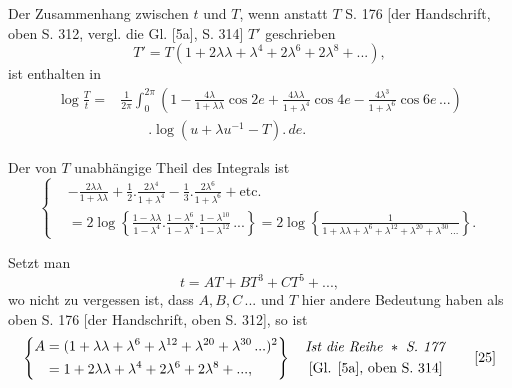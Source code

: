 \begingroup
\makeatletter\tagsleft@true\let\veqno\@@leqno\makeatother
\clearpage{}
\par\indent Der Zusammenhang zwischen $t$ und $T$, wenn anstatt $T$ S. 176 [der Handschrift, oben S. 312, vergl. die Gl. [5a], S. 314] $T'$ geschrieben
\begin{equation}
T'=T(1+2\lambda\lambda+\lambda^4+2\lambda^6+2\lambda^8+{.}{.}{.}),\tag*{[21]}
\end{equation}
\noindent ist enthalten in
\begin{equation}
\begin{aligned}
\log\frac Tt={}&\frac1{2\pi}\int_0^{2\pi}\left(1-\frac{4\lambda}{1+\lambda\lambda}\cos2e+\frac{4\lambda\lambda}{1+\lambda^4}\cos4e-\frac{4\lambda^3}{1+\lambda^6}\cos6e\,{.}{.}{.}\right)\\
&\qquad.\log(u+\lambda u^{-1}-T).\,de.
\end{aligned}\tag*{[22]}
\end{equation}
\par\indent Der von $T$ unabhängige Theil des Integrals ist
{\small\begin{equation}
\left\{\begin{aligned}
&-\frac{2\lambda\lambda}{1+\lambda\lambda}+\frac12.\frac{2\lambda^4}{1+\lambda^4}-\frac13.\frac{2\lambda^6}{1+\lambda^6}+\text{etc.}\\
&=2\log\left\{\frac{1-\lambda\lambda}{1-\lambda^4}.\frac{1-\lambda^6}{1-\lambda^8}.\frac{1-\lambda^{10}}{1-\lambda^{12}}\,{.}{.}{.}\right\}=2\log\left\{\frac1{1+\lambda\lambda+\lambda^6+\lambda^{12}+\lambda^{20}+\lambda^{30}\,{.}{.}{.}}\right\}.
\end{aligned}\right.\tag*{[23]}
\end{equation}}
\noindent {\small[S. 225]}
\par\indent Setzt man
\begin{equation}
t=AT+BT^3+CT^5+{.}{.}{.},\tag*{[24]}
\end{equation}
\noindent wo nicht zu vergessen ist, dass $A,B,C\,{.}{.}{.}$ und $T$ hier andere Bedeutung haben als oben S. 176 [der Handschrift, oben S. 312], so ist
{\small\begin{equation}
\left\{\begin{aligned}
A&=(1+\lambda\lambda+\lambda^6+\lambda^{12}+\lambda^{20}+\lambda^{30}\,{.}{.}{.})^2\\
&=1+2\lambda\lambda+\lambda^4+2\lambda^6+2\lambda^8+{.}{.}{.},
\end{aligned}\right\}\quad
\begin{gathered}
\text{\textit{Ist die Reihe }}\ast\ \text{\textit{S. 177}}\\
\text{[Gl. [5a], oben S. 314]}
\end{gathered}\tag*{[25]}
\end{equation}}

